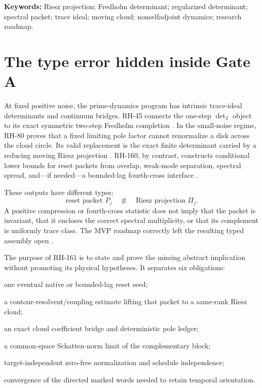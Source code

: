 \documentclass[11pt]{article}
\theoremstyle{definition}
\theoremstyle{remark}
\begin{document}
\noindent\textbf{Keywords:} Riesz projection; Fredholm determinant;
regularized determinant; spectral packet; trace ideal; moving cloud;
nonselfadjoint dynamics; research roadmap.

\section{The type error hidden inside Gate A}

At fixed positive noise, the prime-dynamics program has intrinsic trace-ideal
determinants and continuum bridges.  RH-45 connects the one-step
$\det_2$ object to its exact symmetric two-step Fredholm completion
\citep{WangRH45}.  In the small-noise regime, RH-80 proves
that a fixed limiting pole factor cannot renormalize a disk across the cloud
circle.  Its valid replacement is the exact finite determinant carried by a
reducing moving Riesz projection \citep{WangRH80}.  RH-160, by contrast,
constructs conditional lower bounds for reset packets from overlap, weak-mode
separation, spectral spread, and---if needed---a bounded-lag fourth-cross
interface \citep{WangRH160}.

These outputs have different types:
\[
 \text{reset packet }P_j
 \quad\not\equiv\quad
 \text{Riesz projection }\Pi_j.
\]
A positive compression or fourth-cross statistic does not imply that the
packet is invariant, that it encloses the correct spectral multiplicity, or
that its complement is uniformly trace class.  The MVP roadmap correctly
left the resulting typed assembly open \citep{WangMVP1}.

The purpose of RH-161 is to state and prove the missing abstract implication
without promoting its physical hypotheses.  It separates six obligations:
\begin{description}[leftmargin=3.1em,style=nextline]
\item[$S$] one eventual native or bounded-lag reset seed;
\item[$R$] a contour-resolvent/coupling estimate lifting that packet to a
same-rank Riesz cloud;
\item[$Q$] an exact cloud coefficient bridge and deterministic pole ledger;
\item[$U$] a common-space Schatten-norm limit of the complementary block;
\item[$Z$] target-independent zero-free normalization and schedule
independence;
\item[$T$] convergence of the directed marked words needed to retain temporal
orientation.
\end{description}
\end{document}
